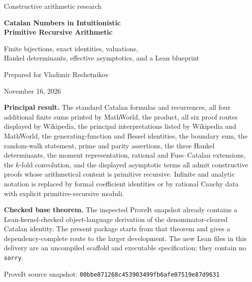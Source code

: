 \documentclass[11pt]{article}
\theoremstyle{definition}
\theoremstyle{remark}
\numberwithin{equation}{section}
\begin{document}
\hypersetup{pageanchor=false}
\begin{titlepage}
\centering
\vspace*{1.0cm}
{\Large Constructive arithmetic research\par}
\vspace{1.0cm}
{\huge\bfseries Catalan Numbers in Intuitionistic\\[7pt]
Primitive Recursive Arithmetic\par}
\vspace{0.7cm}
{\Large Finite bijections, exact identities, valuations,\\[4pt]
Hankel determinants, effective asymptotics, and a Lean blueprint\par}
\vspace{1.0cm}
{\large Prepared for Vladimir Reshetnikov\par}
\vspace{0.25cm}
{\large November 16, 2026\par}
\vfill
\begin{minipage}{0.90\textwidth}
\textbf{Principal result.}
The standard Catalan formulas and recurrences, all four additional finite sums
printed by MathWorld, the product, all six proof routes displayed by Wikipedia, the principal
interpretations listed by Wikipedia and MathWorld, the generating-function
and Bessel identities, the boundary sum,
the random-walk statement, prime and parity assertions, the three Hankel
determinants, the moment representation, rational and Fuss--Catalan
extensions, the $k$-fold convolution, and the displayed asymptotic terms all
admit constructive proofs whose arithmetical content is primitive recursive.
Infinite and analytic notation is replaced by formal coefficient identities or
by rational Cauchy data with explicit primitive-recursive moduli.

\medskip
\textbf{Checked base theorem.}
The inspected ProveIt snapshot already contains a Lean-kernel-checked
object-language derivation of the denominator-cleared Catalan identity.  The
present package starts from that theorem and gives a dependency-complete route
to the larger development.  The new Lean files in this delivery are an
uncompiled scaffold and executable specification; they contain no \texttt{sorry}.
\end{minipage}
\vfill
{\small ProveIt source snapshot:\quad
\texttt{00bbe871268c453903499fb6afe07519e87d9631}\par}
\end{titlepage}
\hypersetup{pageanchor=true}
\end{document}
